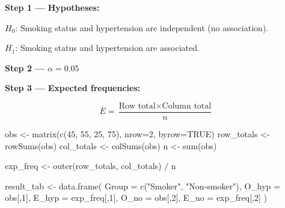 \documentclass[
  12pt,
  letterpaper,
]{book}
\newenvironment{Shaded}{\begin{snugshade}}{\end{snugshade}}
\newcommand{\AttributeTok}[1]{\textcolor[rgb]{0.40,0.45,0.13}{#1}}
\newcommand{\ConstantTok}[1]{\textcolor[rgb]{0.56,0.35,0.01}{#1}}
\newcommand{\DecValTok}[1]{\textcolor[rgb]{0.68,0.00,0.00}{#1}}
\newcommand{\FunctionTok}[1]{\textcolor[rgb]{0.28,0.35,0.67}{#1}}
\newcommand{\NormalTok}[1]{\textcolor[rgb]{0.00,0.23,0.31}{#1}}
\newcommand{\OtherTok}[1]{\textcolor[rgb]{0.00,0.23,0.31}{#1}}
\newcommand{\SpecialCharTok}[1]{\textcolor[rgb]{0.37,0.37,0.37}{#1}}
\newcommand{\StringTok}[1]{\textcolor[rgb]{0.13,0.47,0.30}{#1}}
\begin{document}
\begin{tcolorbox}[enhanced jigsaw, arc=.35mm, bottomrule=.15mm, bottomtitle=1mm, breakable, colback=white, colbacktitle=quarto-callout-tip-color!10!white, colframe=quarto-callout-tip-color-frame, coltitle=black, left=2mm, leftrule=.75mm, opacityback=0, opacitybacktitle=0.6, rightrule=.15mm, title={✅ Solution}, titlerule=0mm, toprule=.15mm, toptitle=1mm]

\textbf{Step 1 --- Hypotheses:}

\(H_0\): Smoking status and hypertension are independent (no
association).

\(H_1\): Smoking status and hypertension are associated.

\textbf{Step 2 ---} \(\alpha = 0.05\)

\textbf{Step 3 --- Expected frequencies:}

\[E = \frac{\text{Row total} \times \text{Column total}}{n}\]

\begin{Shaded}
\begin{Highlighting}[]
\NormalTok{obs }\OtherTok{\textless{}{-}} \FunctionTok{matrix}\NormalTok{(}\FunctionTok{c}\NormalTok{(}\DecValTok{45}\NormalTok{, }\DecValTok{55}\NormalTok{, }\DecValTok{25}\NormalTok{, }\DecValTok{75}\NormalTok{), }\AttributeTok{nrow=}\DecValTok{2}\NormalTok{, }\AttributeTok{byrow=}\ConstantTok{TRUE}\NormalTok{)}
\NormalTok{row\_totals }\OtherTok{\textless{}{-}} \FunctionTok{rowSums}\NormalTok{(obs)}
\NormalTok{col\_totals }\OtherTok{\textless{}{-}} \FunctionTok{colSums}\NormalTok{(obs)}
\NormalTok{n }\OtherTok{\textless{}{-}} \FunctionTok{sum}\NormalTok{(obs)}

\NormalTok{exp\_freq }\OtherTok{\textless{}{-}} \FunctionTok{outer}\NormalTok{(row\_totals, col\_totals) }\SpecialCharTok{/}\NormalTok{ n}

\NormalTok{result\_tab }\OtherTok{\textless{}{-}} \FunctionTok{data.frame}\NormalTok{(}
  \AttributeTok{Group =} \FunctionTok{c}\NormalTok{(}\StringTok{"Smoker"}\NormalTok{, }\StringTok{"Non{-}smoker"}\NormalTok{),}
  \AttributeTok{O\_hyp  =}\NormalTok{ obs[,}\DecValTok{1}\NormalTok{],}
  \AttributeTok{E\_hyp  =}\NormalTok{ exp\_freq[,}\DecValTok{1}\NormalTok{],}
  \AttributeTok{O\_no   =}\NormalTok{ obs[,}\DecValTok{2}\NormalTok{],}
  \AttributeTok{E\_no   =}\NormalTok{ exp\_freq[,}\DecValTok{2}\NormalTok{]}
\NormalTok{)}


\end{Highlighting}
\end{Shaded}
\end{tcolorbox}
\end{document}
